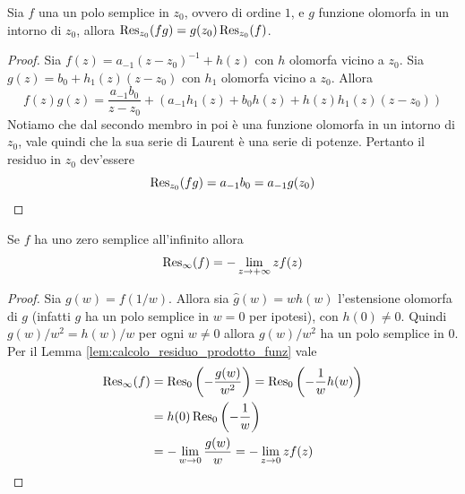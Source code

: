 \begin{lemma}
  Sia $f$ una un polo semplice in $z_0$, ovvero di ordine $1$, e $g$ funzione 
  olomorfa in un intorno di $z_0$, allora $\operatorname{Res}_{z_0}(fg) = g(z_0) \operatorname{Res}_{z_0}(f)$.
  \label{lem:calcolo_residuo_prodotto_funz}
\end{lemma}
\begin{proof}
  Sia $f(z) = a_{-1}(z-z_0)^{-1} + h(z)$ con $h$ olomorfa vicino a $z_0$. Sia
  $g(z) = b_0 + h_1(z) (z-z_0)$ con $h_1$ olomorfa vicino a $z_0$. Allora
  \begin{equation*}
    f(z)g(z) = \frac{a_{-1}b_0}{z-z_0} + \left(a_{-1}h_1(z) + b_0h(z)
    + h(z)h_1(z)(z-z_0)\right)
  \end{equation*}
  Notiamo che dal secondo membro in poi è una funzione olomorfa in un
  intorno di $z_0$, vale quindi che la sua serie di Laurent è una serie di 
  potenze. Pertanto il residuo in $z_0$ dev'essere
  \begin{equation*}
    \operatorname{Res}_{z_0}(fg) = a_{-1}b_0 = a_{-1}g(z_0)
  \end{equation*}
\end{proof}

\begin{corollary}
  Se $f$ ha uno zero semplice all'infinito allora 
  \begin{equation*}
    \operatorname{Res}_\infty(f) = - \lim_{z \to +\infty} z f(z)
  \end{equation*}
  \label{cor:calcolo_residuo_infinito}
\end{corollary}
\begin{proof}
  Sia $g(w) = f(1/w)$. Allora sia $\hat{g}(w) = w h(w)$ l'estensione olomorfa di
  $g$ (infatti $g$ ha un polo semplice in $w = 0$ per ipotesi), con $h(0) \neq 0$. 
  Quindi $g(w)/w^2 = h(w)/w$ per ogni $w \neq 0$ allora $g(w)/w^2$ ha un polo 
  semplice in $0$. Per il Lemma \ref{lem:calcolo_residuo_prodotto_funz} vale 
  \begin{align*}
    \operatorname{Res}_\infty(f) & = \operatorname{Res}_0\left( -\frac{g(w)}{w^2} \right)
    = \operatorname{Res}_0\left(-\frac{1}{w} h(w)\right) \\
    & = h(0) \operatorname{Res}_0 \left( -\frac{1}{w} \right) \\
    & = - \lim_{w \to 0} \frac{g(w)}{w} = - \lim_{z \to 0} z f(z)
  \end{align*}
\end{proof}

